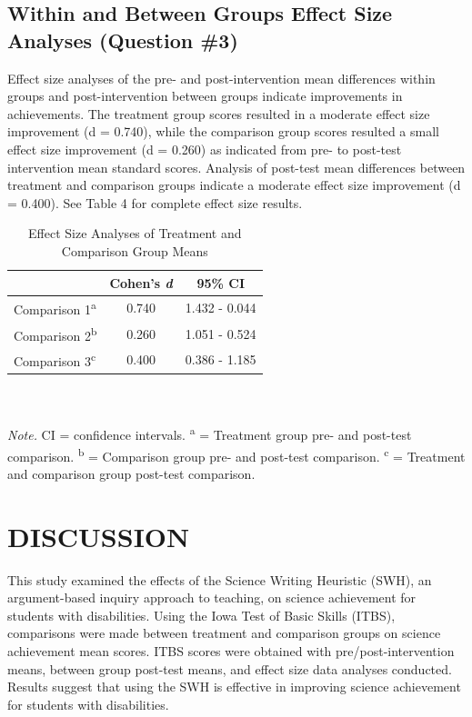 \documentclass[11.5pt]{sig-alternate} %
\begin{document}
\begin{large}
\subsection*{Within and Between Groups Effect Size Analyses (Question \#3)}

Effect size analyses of the pre- and post-interven\-tion mean differences within groups and post-intervention between groups indicate improvements in achievements.  The treatment group scores resulted in a moderate effect size improvement (d = 0.740), while the comparison group scores resulted a small effect size improvement (d = 0.260) as indicated from pre- to post-test intervention mean standard scores.  Analysis of post-test mean differences between treatment and comparison groups indicate a moderate effect size improvement (d = 0.400).  See Table 4 for complete effect size results.

\begin{table}[th]
\caption{Effect Size Analyses of Treatment and Comparison Group Means}
\begin{tabular}{lcc}
\hline
 & Cohen’s \textit{d} & 95\% CI \\ \hline
Comparison 1\textsuperscript{a} & 0.740 & 1.432 - 0.044 \\
Comparison 2\textsuperscript{b} & 0.260 & 1.051 - 0.524 \\
Comparison 3\textsuperscript{c} & 0.400 & 0.386 - 1.185 \\ \hline
\end{tabular}
\\ \\ \textit{Note.} CI = confidence intervals. \textsuperscript{a} = Treatment group pre- and post-test comparison. \textsuperscript{b} = Comparison group pre- and post-test comparison. \textsuperscript{c} = Treatment and comparison group post-test comparison.
\end{table}

\section*{DISCUSSION}

This study examined the effects of the Science Writing Heuristic (SWH), an argument-based inquiry approach to teaching, on science achievement for students with disabilities.  Using the Iowa Test of Basic Skills (ITBS), comparisons were made between treatment and comparison groups on science achievement mean scores.  ITBS scores were obtained with pre/post-inter\-vention means, between group post-test means, and effect size data analyses conducted.  Results suggest that using the SWH is effective in improving science achievement for students with disabilities.  


\end{large}
\end{document}

